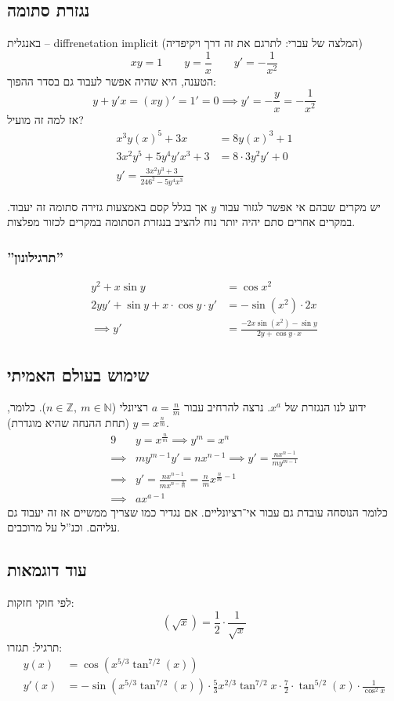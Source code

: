 \documentclass[]{article}
\newcommand\N     {\mathbb{N}}
\newcommand\Z     {\mathbb{Z}}
\newcommand\cosx  {\cos x}
\begin{document}
		\subsection{נגזרת סתומה}
		באנגלית – diffrenetation implicit (המלצה של עברי: לתרגם את זה דרך ויקיפדיה)
		\[ xy = 1 \quad \quad y = \frac{1}{x} \quad \quad y' = - \frac{1}{x^2} \]
		הטענה, היא שהיה אפשר לעבוד גם בסדר ההפוך: 
		\[ y + y'x = (xy)' = 1' = 0 \implies y' = -\frac{y}{x} = -\frac{1}{x^2} \]
		אז למה זה מועיל? 
		\begin{align}
			x^3y(x)^5 + 3x &= 8y(x)^3 + 1 \\
			3x^2y^5 + 5y^4y'x^3 +3 &= 8 \cdot 3y^2y'+ 0 \\
			y' = \frac{3x^2y^3 + 3}{246^2 - 5y^4x^3}
		\end{align}
		
		יש מקרים שבהם אי אפשר לגזור עבור $y$ אך בגלל קסם באמצעות גזירה סתומה זה יעבוד. במקרים אחרים סתם יהיה יותר נוח להציב בנגזרת הסתומה במקרים לכזור מפלצות. 
		\subsubsection{''תרגילונון''}
		\begin{align}
			y^2 + x\sin y &= \cosx^2 \\
			2y y' + \sin y + x \cdot \cos y \cdot y' &= -\sin(x^2) \cdot 2x \\
			\implies y' &= \frac{-2x\sin(x^2) - \sin y}{2y + \cos y \cdot x}
		\end{align}
		\subsection{שימוש בעולם האמיתי}
		ידוע לנו הנגזרת של $x^a$. נרצה להרחיב עבור $a = \frac{n}{m}$ רציונלי ($n \in \Z, \ m \in \N$). כלומר, $y = x^\frac{n}{m}$ (תחת ההנחה שהיא מוגדרת). 
		\begin{alignat}{9}
			&y = x^{\frac{n}{m}} \implies y^m = x^n \\
			\implies & my^{m - 1}y' = nx^{n - 1} \implies y' = \frac{nx^{n - 1}}{my^{m - 1}} \\
			\implies & y' = \frac{nx^{n - 1}}{m x^{n - \frac{n}{m}}} = \frac{n}{m}x^{\frac{n}{m} - 1} \\
			\implies &ax^{a - 1}
		\end{alignat}
		כלומר הנוסחה עובדת גם עבור אי־רציונליים. אם נגדיר כמו שצריך ממשיים אז זה יעבוד גם עליהם. וכנ''ל על מרוכבים. 
		
		\subsection{עוד דוגמאות}
		לפי חוקי חזקות: 
		\[ (\sqrt{x}) = \frac{1}{2} \cdot \frac{1}{\sqrt{x}} \]
		תרגיל: תגזרו: 
		\begin{align}
			y(x) &= \cos(x^{5 / 3} \tan^{7 / 2}(x)) \\
			y'(x) &= -\sin(x^{5 / 3} \tan^{7 / 2}(x)) \cdot \frac{5}{3}x^{2 / 3} \tan^{7/ 2}x \cdot \frac{7}{2} \cdot \tan^{5 / 2}(x) \cdot \frac{1}{\cos^2x}
		\end{align}
		
\end{document}
